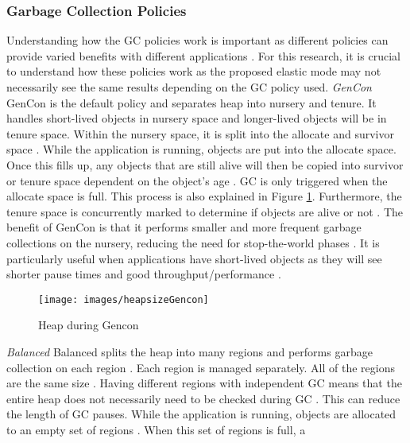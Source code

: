 \subsubsection{Garbage Collection Policies}
Understanding how the GC policies work is important as different policies can provide varied benefits with different applications \cite{neu2014automatic}. For this research, it is crucial to
understand how these policies work as the proposed elastic mode may not necessarily see the same results depending on the GC policy used.
\newline\newline
\emph{GenCon}
\newline\newline
GenCon is the default policy and separates heap into nursery and
tenure. It handles short-lived objects
in nursery space and longer-lived objects will be in tenure space. Within the nursery space, it is split into the allocate and survivor space \cite{nartovich2007ibm}. While the application is running, objects are put into the allocate
space. Once this fills up, any objects that are still alive will then be copied into survivor or tenure space dependent on the object's age \cite{persson2006gc1}. GC is only triggered when the allocate space is full. This process is also
explained in Figure \ref{fig:gencon}. Furthermore, the tenure space is concurrently marked to determine
if objects are alive or not \cite{nartovich2007ibm}. The benefit of GenCon is that it performs smaller and more frequent garbage collections on the nursery, reducing the need for
stop-the-world phases \cite{persson2006gc2}. It is particularly useful when
applications have short-lived objects as they will see shorter pause
times and good throughput/performance \cite{persson2006gc2}.
\begin{figure} [H]
    \centering
    \texttt{[image: images/heapsizeGencon]}
    \caption{Heap during Gencon }
    \label{fig:gencon}
\end{figure}
\emph{Balanced}
\newline\newline
Balanced splits the heap into many regions and performs garbage collection on each region \cite{ibmBalanced}. Each region is managed
separately. All of the regions are the same size \cite{ibmwhenbalanced}. Having different
regions with independent GC means that the entire heap does not necessarily
need to be checked during GC \cite{ibmwhenbalanced}. This can reduce the length of GC pauses.
While the application is running, objects are allocated to an empty set of regions \cite{ibmBalanced}. When this set of regions is full, a
